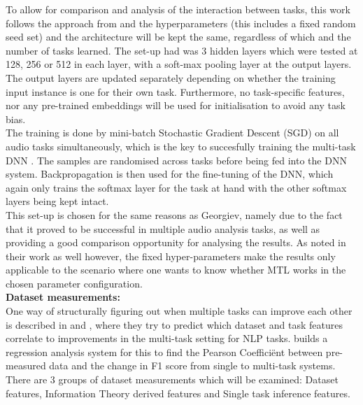 	To allow for comparison and analysis of the interaction between tasks, this work follows the approach from \cite{alonso2016multitask} and \cite{bingel2017identifying} the hyperparameters (this includes a fixed random seed set) and the architecture will be kept the same, regardless of which and the number of tasks learned. The set-up \citet{georgiev2017heterogeneous} had was 3 hidden layers which were tested at 128, 256 or 512 in each layer, with a soft-max pooling layer at the output layers. The output layers are updated separately depending on whether the training input instance is one for their own task. Furthermore, no task-specific features, nor any pre-trained embeddings will be used for initialisation to avoid any task bias. \\
	
	The training is done by mini-batch Stochastic Gradient Descent (SGD) on all audio tasks simultaneously, which is the key to succesfully training the multi-task DNN \citep{georgiev2017heterogeneous}. The samples are randomised across tasks before being fed into the DNN system. Backpropagation is then used for the fine-tuning of the DNN, which again only trains the softmax layer for the task at hand with the other softmax layers being kept intact. \\
	
	This set-up is chosen for the same reasons as Georgiev, namely due to the fact that it proved to be successful in multiple audio analysis tasks, as well as providing a good comparison opportunity for analysing the results. As \citet{bingel2017identifying} noted in their work as well however, the fixed hyper-parameters make the results only applicable to the scenario where one wants to know whether MTL works in the chosen parameter configuration.\\
	
	\textbf{Dataset measurements:}\\
	One way of structurally figuring out when multiple tasks can improve each other is described in \citet{alonso2016multitask} and \citet{bingel2017identifying}, where they try to predict which dataset and task features correlate to improvements in the multi-task setting for NLP tasks. \citet{bingel2017identifying} builds a regression analysis system for this to find the Pearson Coefficiënt between pre-measured data and the change in F1 score from single to multi-task systems. There are 3 groups of dataset measurements which will be examined: Dataset features, Information Theory derived features and Single task inference features. \\
	
